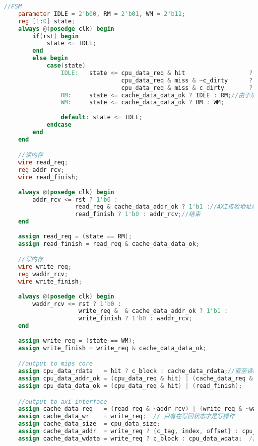 \begin{lstlisting}[language=Verilog,frame=single]
    //FSM
    parameter IDLE = 2'b00, RM = 2'b01, WM = 2'b11;
    reg [1:0] state;
    always @(posedge clk) begin
        if(rst) begin
            state <= IDLE;
        end
        else begin
            case(state)
                IDLE:   state <= cpu_data_req & hit                  ? IDLE :
                                 cpu_data_req & miss & ~c_dirty      ?   RM :
                                 cpu_data_req & miss & c_dirty       ?   WM : IDLE;//Writeback和WriteAllocate策略下的状态机
                RM:     state <= cache_data_data_ok ? IDLE : RM;//由于块只有1个字可以不用回填
                WM:     state <= cache_data_data_ok ? RM : WM;
                
                default: state <= IDLE;
            endcase
        end
    end

    //读内存
    wire read_req;
    reg addr_rcv;
    wire read_finish;
    
    always @(posedge clk) begin
        addr_rcv <= rst ? 1'b0 :
                    read_req & cache_data_addr_ok ? 1'b1 ://AXI接收地址成功
                    read_finish ? 1'b0 : addr_rcv;//结束
    end
    
    assign read_req = (state == RM);
    assign read_finish = read_req & cache_data_data_ok;

    //写内存
    wire write_req;
    reg waddr_rcv;
    wire write_finish;
    
    always @(posedge clk) begin
        waddr_rcv <= rst ? 1'b0 :
                     write_req &  & cache_data_addr_ok ? 1'b1 :
                     write_finish ? 1'b0 : waddr_rcv;
    end
    
    assign write_req = (state == WM);
    assign write_finish = write_req & cache_data_data_ok;

    //output to mips core
    assign cpu_data_rdata   = hit ? c_block : cache_data_rdata;//直至读命中把CacheLine中的数据发送
    assign cpu_data_addr_ok = (cpu_data_req & hit) | (cache_data_req & cache_data_addr_ok);
    assign cpu_data_data_ok = (cpu_data_req & hit) | (read_finish);

    //output to axi interface
    assign cache_data_req   = (read_req & ~addr_rcv) | (write_req & ~waddr_rcv);
    assign cache_data_wr    = write_req;  // 只有在写回状态才是写操作
    assign cache_data_size  = cpu_data_size;
    assign cache_data_addr  = write_req ? {c_tag, index, offset} : cpu_data_addr;//写回脏数据，读取新数据
    assign cache_data_wdata = write_req ? c_block : cpu_data_wdata;  // 写回时发送脏数据


\end{lstlisting}
